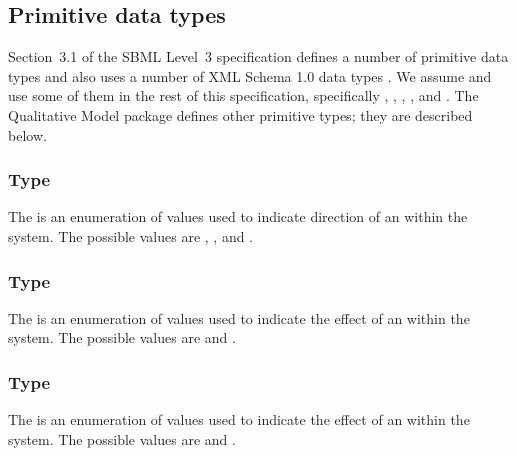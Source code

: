 \subsection{Primitive data types}
\label{primitive-types}

Section~3.1 of the SBML Level~3 specification defines a number of
primitive data types and also uses a number of XML Schema 1.0 data
types \citep{biron:2000}.  We assume and use some of them in the rest of
this specification, specifically , ,
, , and . The Qualitative Model package defines other primitive types;
they are described below.

%
%
\subsubsection{Type \fixttspace{}}
\label{primtype-sign}

The  is an enumeration of values used to indicate direction of an \Input within the system.  The possible values are , ,  and . 

\subsubsection{Type \fixttspace{}}
\label{primtype-inputeffect}
The  is an enumeration of values used to indicate the effect of an \Input \Transition within the system.  The possible values are  and .

\subsubsection{Type \fixttspace{}}
\label{primtype-outputeffect}
The  is an enumeration of values used to indicate the effect of an \Output \Transition within the system.  The possible values are  and .

